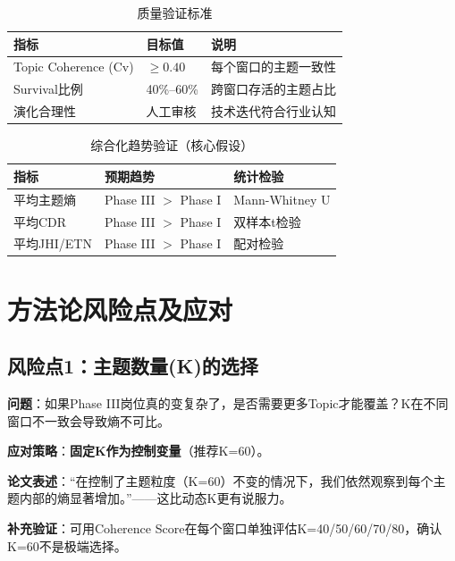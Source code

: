 \documentclass[12pt, a4paper]{ctexart}
\newenvironment{warning}{%
  \begin{tcolorbox}[colback=red!5, colframe=red!50!black, boxrule=0.5pt, arc=2pt, breakable, title=\textbf{注意}]
}{%
  \end{tcolorbox}
}
\begin{document}
\begin{table}[h]
\centering
\caption{质量验证标准}
\begin{tabular}{lll}
\toprule
\textbf{指标} & \textbf{目标值} & \textbf{说明} \\
\midrule
Topic Coherence (Cv) & $\geq 0.40$ & 每个窗口的主题一致性 \\
Survival比例 & 40\%--60\% & 跨窗口存活的主题占比 \\
演化合理性 & 人工审核 & 技术迭代符合行业认知 \\
\bottomrule
\end{tabular}
\end{table}

\begin{table}[h]
\centering
\caption{综合化趋势验证（核心假设）}
\begin{tabular}{lll}
\toprule
\textbf{指标} & \textbf{预期趋势} & \textbf{统计检验} \\
\midrule
平均主题熵 & Phase III $>$ Phase I & Mann-Whitney U \\
平均CDR & Phase III $>$ Phase I & 双样本t检验 \\
平均JHI/ETN & Phase III $>$ Phase I & 配对检验 \\
\bottomrule
\end{tabular}
\end{table}

\section{方法论风险点及应对}

\subsection{风险点1：主题数量(K)的选择}

\begin{warning}
\textbf{问题}：如果Phase III岗位真的变复杂了，是否需要更多Topic才能覆盖？K在不同窗口不一致会导致熵不可比。
\end{warning}

\textbf{应对策略}：\textbf{固定K作为控制变量}（推荐K=60）。

\textbf{论文表述}：``在控制了主题粒度（K=60）不变的情况下，我们依然观察到每个主题内部的熵显著增加。''——这比动态K更有说服力。

\textbf{补充验证}：可用Coherence Score在每个窗口单独评估K=40/50/60/70/80，确认K=60不是极端选择。
\end{document}

